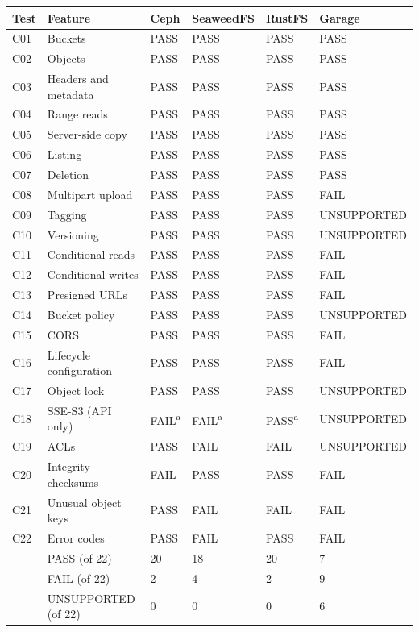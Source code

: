 \begin{tabularx}{\textwidth}{@{}lXllll@{}}
\toprule
Test & Feature & Ceph & SeaweedFS & RustFS & Garage \\
\midrule
C01 & Buckets & PASS & PASS & PASS & PASS \\
C02 & Objects & PASS & PASS & PASS & PASS \\
C03 & Headers and metadata & PASS & PASS & PASS & PASS \\
C04 & Range reads & PASS & PASS & PASS & PASS \\
C05 & Server-side copy & PASS & PASS & PASS & PASS \\
C06 & Listing & PASS & PASS & PASS & PASS \\
C07 & Deletion & PASS & PASS & PASS & PASS \\
\midrule
C08 & Multipart upload & PASS & PASS & PASS & FAIL \\
C09 & Tagging & PASS & PASS & PASS & UNSUPPORTED \\
C10 & Versioning & PASS & PASS & PASS & UNSUPPORTED \\
C11 & Conditional reads & PASS & PASS & PASS & FAIL \\
C12 & Conditional writes & PASS & PASS & PASS & FAIL \\
C13 & Presigned URLs & PASS & PASS & PASS & FAIL \\
C14 & Bucket policy & PASS & PASS & PASS & UNSUPPORTED \\
C15 & CORS & PASS & PASS & PASS & FAIL \\
C16 & Lifecycle configuration & PASS & PASS & PASS & FAIL \\
C17 & Object lock & PASS & PASS & PASS & UNSUPPORTED \\
C18 & SSE-S3 (API only) & FAIL\textsuperscript{a} & FAIL\textsuperscript{a} & PASS\textsuperscript{a} & UNSUPPORTED \\
C19 & ACLs & PASS & FAIL & FAIL & UNSUPPORTED \\
C20 & Integrity checksums & FAIL & PASS & PASS & FAIL \\
C21 & Unusual object keys & PASS & FAIL & FAIL & FAIL \\
C22 & Error codes & PASS & FAIL & PASS & FAIL \\
\midrule
 & PASS (of 22) & 20 & 18 & 20 & 7 \\
 & FAIL (of 22) & 2 & 4 & 2 & 9 \\
 & UNSUPPORTED (of 22) & 0 & 0 & 0 & 6 \\
\bottomrule
\end{tabularx}
